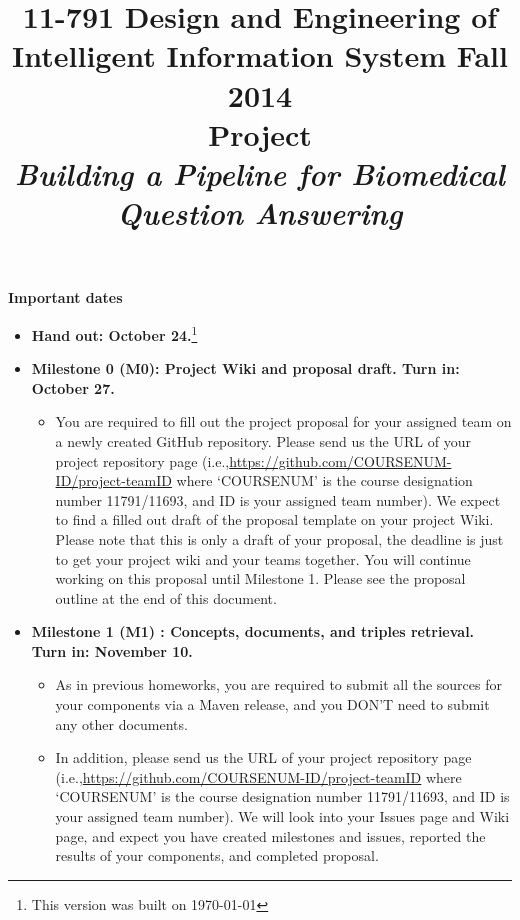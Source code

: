 \documentclass[oneside]{memoir}
\title{{\bfseries 11-791 Design and Engineering of Intelligent Information
System Fall 2014\\Project}\\
\vspace{1em}
\itshape\rmfamily Building a Pipeline for Biomedical Question
Answering}
\date{}
\begin{document}
\begin{titlingpage}
\maketitle

\hspace{-0.1\textwidth}
\begin{minipage}{1.2\textwidth}
\vspace{-5em}
\textbf{Important dates}
\begin{itemize}

\item \textbf{Hand out: October 24.}\footnote{This version was built on \today}


\item \textbf{Milestone 0 (M0): Project Wiki and proposal draft. Turn in: October 27.}
\begin{itemize}
\item You are required to fill out the project proposal for your assigned team on a newly created GitHub repository. Please send us the URL of your project repository page (i.e.,\url{https://github.com/COURSENUM-ID/project-teamID} where `COURSENUM' is the course designation number 11791/11693, and ID is your assigned team number). We expect to find a filled out draft of the proposal template on your project Wiki. Please note that this is only a draft of your proposal, the deadline is just to get your project wiki and your teams together. You will continue working on this proposal until Milestone 1. Please see the proposal outline at the end of this document.
\end{itemize}
\item \textbf{Milestone 1 (M1) : Concepts, documents, and triples retrieval.  Turn in: November 10.}

\begin{itemize}

\item As in previous homeworks, you are required to submit all the sources for your components via a Maven release, and you DON'T need to submit any other documents. 

\item In addition, please send us the URL of your project repository page (i.e.,\url{https://github.com/COURSENUM-ID/project-teamID} where `COURSENUM' is the course designation number 11791/11693, and ID is your assigned team number). We will look into your Issues page and Wiki page, and expect you have created milestones and issues, reported the results of your components, and completed proposal.


\end{itemize}
\end{itemize}
\end{minipage}
\end{titlingpage}
\end{document}
